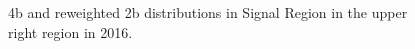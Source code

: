 \begin{figure}[ht]
 
 
    \caption{4b and reweighted 2b distributions in Signal Region in the upper right region in 2016.}
    \label{fig:upper-right-4b-SR-2016}
\end{figure}


